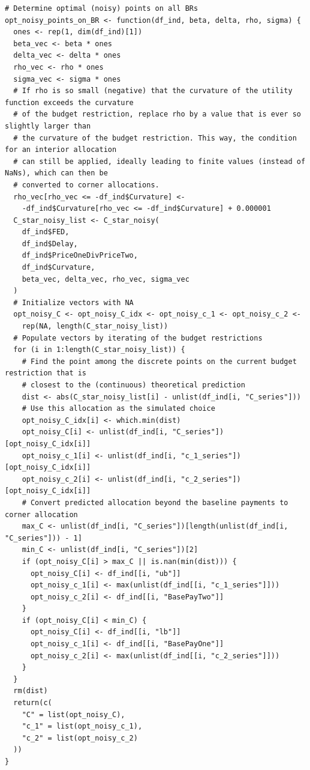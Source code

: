 \begin{lstlisting}
# Determine optimal (noisy) points on all BRs
opt_noisy_points_on_BR <- function(df_ind, beta, delta, rho, sigma) {
  ones <- rep(1, dim(df_ind)[1])
  beta_vec <- beta * ones
  delta_vec <- delta * ones
  rho_vec <- rho * ones
  sigma_vec <- sigma * ones
  # If rho is so small (negative) that the curvature of the utility function exceeds the curvature
  # of the budget restriction, replace rho by a value that is ever so slightly larger than
  # the curvature of the budget restriction. This way, the condition for an interior allocation
  # can still be applied, ideally leading to finite values (instead of NaNs), which can then be
  # converted to corner allocations.
  rho_vec[rho_vec <= -df_ind$Curvature] <-
    -df_ind$Curvature[rho_vec <= -df_ind$Curvature] + 0.000001
  C_star_noisy_list <- C_star_noisy(
    df_ind$FED,
    df_ind$Delay,
    df_ind$PriceOneDivPriceTwo,
    df_ind$Curvature,
    beta_vec, delta_vec, rho_vec, sigma_vec
  )
  # Initialize vectors with NA
  opt_noisy_C <- opt_noisy_C_idx <- opt_noisy_c_1 <- opt_noisy_c_2 <-
    rep(NA, length(C_star_noisy_list))
  # Populate vectors by iterating of the budget restrictions
  for (i in 1:length(C_star_noisy_list)) {
    # Find the point among the discrete points on the current budget restriction that is
    # closest to the (continuous) theoretical prediction
    dist <- abs(C_star_noisy_list[i] - unlist(df_ind[i, "C_series"]))
    # Use this allocation as the simulated choice
    opt_noisy_C_idx[i] <- which.min(dist)
    opt_noisy_C[i] <- unlist(df_ind[i, "C_series"])[opt_noisy_C_idx[i]]
    opt_noisy_c_1[i] <- unlist(df_ind[i, "c_1_series"])[opt_noisy_C_idx[i]]
    opt_noisy_c_2[i] <- unlist(df_ind[i, "c_2_series"])[opt_noisy_C_idx[i]]
    # Convert predicted allocation beyond the baseline payments to corner allocation
    max_C <- unlist(df_ind[i, "C_series"])[length(unlist(df_ind[i, "C_series"])) - 1]
    min_C <- unlist(df_ind[i, "C_series"])[2]
    if (opt_noisy_C[i] > max_C || is.nan(min(dist))) {
      opt_noisy_C[i] <- df_ind[[i, "ub"]]
      opt_noisy_c_1[i] <- max(unlist(df_ind[[i, "c_1_series"]]))
      opt_noisy_c_2[i] <- df_ind[[i, "BasePayTwo"]]
    }
    if (opt_noisy_C[i] < min_C) {
      opt_noisy_C[i] <- df_ind[[i, "lb"]]
      opt_noisy_c_1[i] <- df_ind[[i, "BasePayOne"]]
      opt_noisy_c_2[i] <- max(unlist(df_ind[[i, "c_2_series"]]))
    }
  }
  rm(dist)
  return(c(
    "C" = list(opt_noisy_C),
    "c_1" = list(opt_noisy_c_1),
    "c_2" = list(opt_noisy_c_2)
  ))
}


\end{lstlisting}
